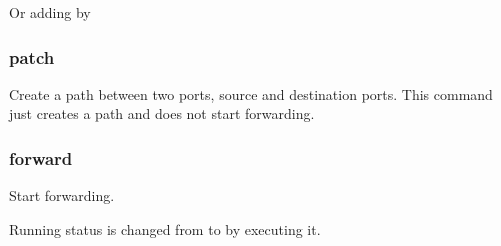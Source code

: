 \documentclass[a4paper,11pt,openany,oneside,english]{sphinxmanual}
\begin{document}
\begin{sphinxVerbatim}[commandchars=\\\{\},formatcom=\footnotesize]
\end{sphinxVerbatim}

Or adding  by

\begin{sphinxVerbatim}[commandchars=\\\{\},formatcom=\footnotesize]
\end{sphinxVerbatim}


\subsubsection{patch}
\label{\detokenize{commands/secondary/spp_nfv:patch}}\label{\detokenize{commands/secondary/spp_nfv:commands-spp-nfv-patch}}
Create a path between two ports, source and destination ports.
This command just creates a path and does not start forwarding.

\begin{sphinxVerbatim}[commandchars=\\\{\},formatcom=\footnotesize]
\end{sphinxVerbatim}


\subsubsection{forward}
\label{\detokenize{commands/secondary/spp_nfv:forward}}\label{\detokenize{commands/secondary/spp_nfv:commands-spp-nfv-forward}}
Start forwarding.

\begin{sphinxVerbatim}[commandchars=\\\{\},formatcom=\footnotesize]
\end{sphinxVerbatim}

Running status is changed from  to  by
executing it.

\begin{sphinxVerbatim}[commandchars=\\\{\},formatcom=\footnotesize]
\end{sphinxVerbatim}
\end{document}
